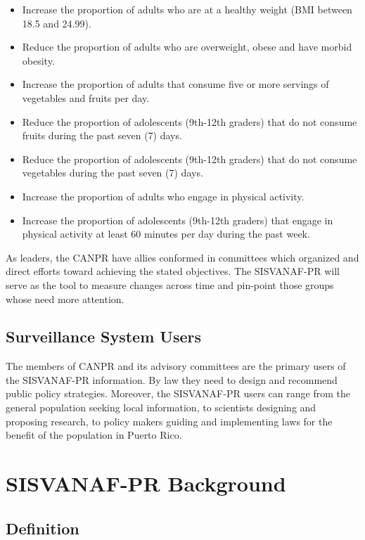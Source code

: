 \documentclass[12pt,letterpaper]{report}
\begin{document}
 \begin{itemize}
        \item Increase the proportion of adults who are at a healthy weight (BMI between 18.5 and 24.99).
        \item Reduce the proportion of adults who are overweight, obese and have morbid obesity.
        \item Increase the proportion of adults that consume five or more servings of vegetables and fruits per day.
        \item Reduce the proportion of adolescents (9th-12th graders) that do not consume fruits during the past seven (7) days.
        \item Reduce the proportion of adolescents (9th-12th graders) that do not consume vegetables during the past seven (7) days.
        \item Increase the proportion of adults who engage in physical activity.
        \item Increase the proportion of adolescents (9th-12th graders) that engage in physical activity at least 60 minutes per day during the past week.
	\end{itemize}

As leaders, the CANPR have allies conformed in committees which organized and direct efforts toward achieving the stated objectives. The SISVANAF-PR will serve as the tool to measure changes across time and pin-point those groups whose need more attention.
\subsection{Surveillance System Users}

The members of CANPR and its advisory committees are the primary users of the SISVANAF-PR information. By law they need to design and recommend public policy strategies.  Moreover, the SISVANAF-PR users can range from the general population seeking local information, to scientists designing and proposing research, to policy makers guiding and implementing laws for the benefit of the population in Puerto Rico.
\section{SISVANAF-PR Background}
\subsection{Definition}
\end{document}
